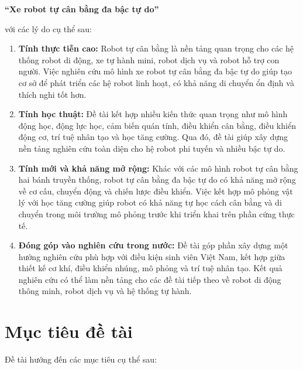 \begin{center}
    \textbf{``Xe robot tự cân bằng đa bậc tự do''}
\end{center}

với các lý do cụ thể sau:

\begin{enumerate}[leftmargin=1.5cm, label=\arabic*.]
    \item \textbf{Tính thực tiễn cao:} Robot tự cân bằng là nền tảng quan trọng cho
    các hệ thống robot di động, xe tự hành mini, robot dịch vụ và robot hỗ trợ con người.
    Việc nghiên cứu mô hình xe robot tự cân bằng đa bậc tự do giúp tạo cơ sở để phát triển
    các hệ robot linh hoạt, có khả năng di chuyển ổn định và thích nghi tốt hơn.

    \item \textbf{Tính học thuật:} Đề tài kết hợp nhiều kiến thức quan trọng như mô hình
    động học, động lực học, cảm biến quán tính, điều khiển cân bằng, điều khiển động cơ,
    trí tuệ nhân tạo và học tăng cường. Qua đó, đề tài giúp xây dựng nền tảng nghiên cứu
    toàn diện cho hệ robot phi tuyến và nhiều bậc tự do.

    \item \textbf{Tính mới và khả năng mở rộng:} Khác với các mô hình robot tự cân bằng
    hai bánh truyền thống, robot tự cân bằng đa bậc tự do có khả năng mở rộng về cơ cấu,
    chuyển động và chiến lược điều khiển. Việc kết hợp mô phỏng vật lý với học tăng cường
    giúp robot có khả năng tự học cách cân bằng và di chuyển trong môi trường mô phỏng
    trước khi triển khai trên phần cứng thực tế.

    \item \textbf{Đóng góp vào nghiên cứu trong nước:} Đề tài góp phần xây dựng một hướng
    nghiên cứu phù hợp với điều kiện sinh viên Việt Nam, kết hợp giữa thiết kế cơ khí,
    điều khiển nhúng, mô phỏng và trí tuệ nhân tạo. Kết quả nghiên cứu có thể làm nền tảng
    cho các đề tài tiếp theo về robot di động thông minh, robot dịch vụ và hệ thống tự hành.
\end{enumerate}


\section{Mục tiêu đề tài}

Đề tài hướng đến các mục tiêu cụ thể sau:

